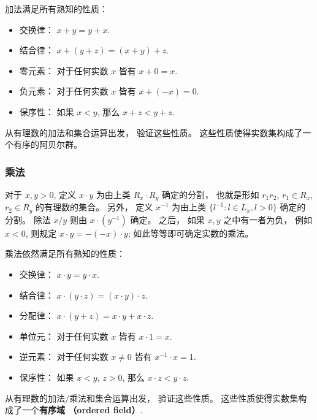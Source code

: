 加法满足所有熟知的性质：

\begin{itemize}
\item 交换律： $x+y=y+x$.
\item 结合律： $x+(y+z)=(x+y)+z$.
\item 零元素： 对于任何实数 $x$ 皆有 $x+0=x$.
\item 负元素： 对于任何实数 $x$ 皆有 $x+(-x)=0$.
\item 保序性： 如果 $x<y$, 那么 $x+z<y+z$.
\end{itemize}

\begin{exercise}{}
从有理数的加法和集合运算出发， 验证这些性质。 这些性质使得实数集构成了一个有序的阿贝尔群。
\end{exercise}

\subsubsection{乘法}

对于 $x,y>0$, 定义 $x\cdot y$ 为由上类 $R_x\cdot R_y$ 确定的分割， 也就是形如 $r_1r_2$, $r_1\in R_x$, $r_2\in R_y$ 的有理数的集合。 另外， 定义 $x^{-1}$ 为由上类 $\{l^{-1}:l\in L_x,l>0\}$ 确定的分割。 除法 $x/y$ 则由 $x\cdot(y^{-1})$ 确定。 之后， 如果 $x,y$ 之中有一者为负， 例如 $x<0$, 则规定 $x\cdot y=-(-x)\cdot y$; 如此等等即可确定实数的乘法。 

乘法依然满足所有熟知的性质：

\begin{itemize}
\item 交换律： $x\cdot y=y\cdot x$.
\item 结合律： $x\cdot (y\cdot z)=(x\cdot y)\cdot z$.
\item 分配律： $x\cdot (y+z)=x\cdot y+x\cdot z$.
\item 单位元： 对于任何实数 $x$ 皆有 $x\cdot 1=x$.
\item 逆元素： 对于任何实数 $x\neq0$ 皆有 $x^{-1}\cdot x=1$.
\item 保序性： 如果 $x<y$, $z>0$, 那么 $x\cdot z<y\cdot z$.
\end{itemize}

\begin{exercise}{}
从有理数的加法/乘法和集合运算出发， 验证这些性质。 这些性质使得实数集构成了一个\textbf{有序域 （ordered field）}.
\end{exercise}

